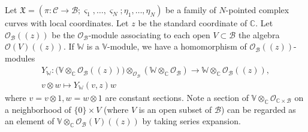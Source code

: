 \documentclass[12pt,b5paper,notitlepage]{report}
\theoremstyle{definition}
\theoremstyle{plain}
\newcommand{\fk}{\mathfrak}
\newcommand{\mc}{\mathcal}
\newcommand{\scr}{\mathscr}
\newcommand{\sgm}{\varsigma}
\newcommand{\Vbb}{\mathbb V}
\newcommand{\Wbb}{\mathbb W}
\newcommand{\Cbb}{\mathbb C}
\numberwithin{equation}{section}
\begin{document}
Let $\fk X=(\pi:\mc C\rightarrow\mc B;\sgm_1,\dots,\sgm_N;\eta_1,\dots,\eta_N)$ be a family of $N$-pointed complex curves with local coordinates. Let $z$ be the standard coordinate of $\Cbb$. Let $\scr O_{\mc B}((z))$ be the $\scr O_{\mc B}$-module associating to each open $V\subset\mc B$ the algebra $\scr O(V)((z))$. If $\Wbb$ is a $\Vbb$-module, we have a homomorphism of $\scr O_{\mc B}((z))$-modules \index{Y@$Y,Y_\Wbb$}
\begin{gather}
Y_\Wbb:\big(\Vbb\otimes_\Cbb\scr O_{\mc B}((z))\big)\otimes_{\scr O_{\mc B}} (\Wbb\otimes_\Cbb\scr O_{\mc B})\rightarrow \Wbb\otimes_\Cbb\scr O_{\mc B}((z)),\nonumber\\
v\otimes w\mapsto Y_{\Wbb}(v,z)w 
\end{gather}
where $v=v\otimes 1,w=w\otimes 1$ are constant sections. Note a section of $\Vbb\otimes_\Cbb\scr O_{\Cbb\times\mc B}$ on a neighborhood of $\{0\}\times V$ (where $V$ is an open subset of $\mc B$) can be regarded as an element of $\Vbb\otimes_\Cbb\scr O_{\mc B}(V)((z))$ by taking series expansion.
\end{document}
